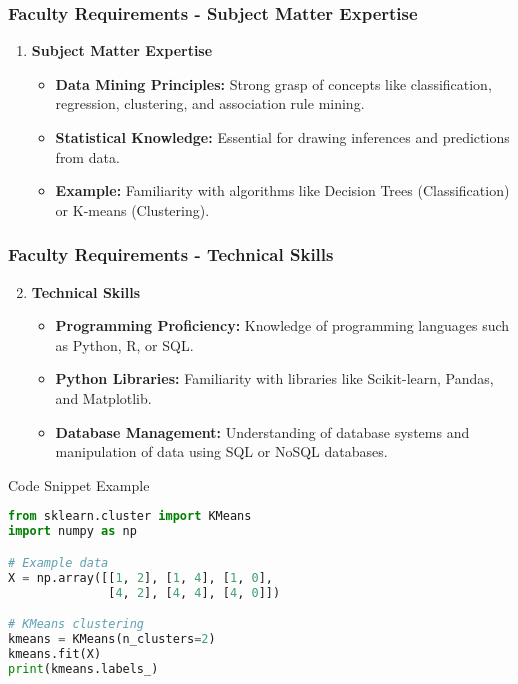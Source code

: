 \documentclass[aspectratio=169]{beamer}
\begin{document}
\begin{frame}
    \frametitle{Faculty Requirements - Subject Matter Expertise}
    \begin{enumerate}
        \item \textbf{Subject Matter Expertise}
        \begin{itemize}
            \item \textbf{Data Mining Principles:} Strong grasp of concepts like classification, regression, clustering, and association rule mining. 
            \item \textbf{Statistical Knowledge:} Essential for drawing inferences and predictions from data.
            \item \textbf{Example:} Familiarity with algorithms like Decision Trees (Classification) or K-means (Clustering).
        \end{itemize}
    \end{enumerate}
\end{frame}

\begin{frame}[fragile]
    \frametitle{Faculty Requirements - Technical Skills}
    \begin{enumerate}
        \setcounter{enumi}{1}
        \item \textbf{Technical Skills}
        \begin{itemize}
            \item \textbf{Programming Proficiency:} Knowledge of programming languages such as Python, R, or SQL.
            \item \textbf{Python Libraries:} Familiarity with libraries like Scikit-learn, Pandas, and Matplotlib.
            \item \textbf{Database Management:} Understanding of database systems and manipulation of data using SQL or NoSQL databases.
        \end{itemize}
    \end{enumerate}
    
    \begin{block}{Code Snippet Example}
    \begin{lstlisting}[language=Python]
from sklearn.cluster import KMeans
import numpy as np

# Example data
X = np.array([[1, 2], [1, 4], [1, 0],
              [4, 2], [4, 4], [4, 0]])

# KMeans clustering
kmeans = KMeans(n_clusters=2)
kmeans.fit(X)
print(kmeans.labels_)
    \end{lstlisting}
    \end{block}
\end{frame}
\end{document}
